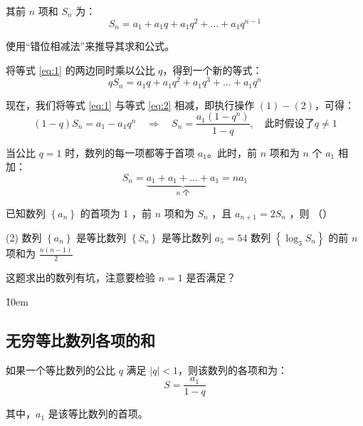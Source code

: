 \begin{theorem}
    其前 $n$ 项和 $S_n$ 为：
    \begin{equation}
        S_n = a_1 + a_1q + a_1q^2 + \dots + a_1q^{n-1} \label{eq:1}
    \end{equation}

    使用“错位相减法”来推导其求和公式。

    将等式 \eqref{eq:1} 的两边同时乘以公比 $q$，得到一个新的等式：
    \begin{equation}
        qS_n = a_1q + a_1q^2 + a_1q^3 + \dots + a_1q^n \label{eq:2}
    \end{equation}

    现在，我们将等式 \eqref{eq:1} 与等式 \eqref{eq:2} 相减，即执行操作 $(1) - (2)$，可得：
    $$ (1-q)S_n = a_1 - a_1q^n \quad \Rightarrow \quad S_n = \frac{a_1(1-q^n)}{1-q} , \quad \text{此时假设了} q \neq 1$$

    当公比 $q=1$ 时，数列的每一项都等于首项 $a_1$。此时，前 $n$ 项和为 $n$ 个 $a_1$ 相加：
    $$ S_n = \underbrace{a_1 + a_1 + \dots + a_1}_{n \text{ 个}} = na_1 $$
\end{theorem}

\begin{example}
    已知数列 $\left\{a_n\right\}$ 的首项为 1 ，前 $n$ 项和为 $S_n$ ，且 $a_{n+1}=2 S_n$ ，则 （\qquad）
    \begin{tasks}(2)
        \task 数列 $\left\{a_n\right\}$ 是等比数列
        \task $\left\{S_n\right\}$ 是等比数列
        \task $a_5=54$
        \task 数列 $\left\{\log _3 S_n\right\}$ 的前 $n$ 项和为 $\frac{n(n-1)}{2}$
    \end{tasks}
\end{example}

\begin{tips}
    这题求出的数列有坑，注意要检验 $n = 1$ 是否满足？
\end{tips}

\v{10em}

\subsection{无穷等比数列各项的和}

\begin{theorem}[无穷等比数列各项的和]
    如果一个等比数列的公比 $q$ 满足 $|q| < 1$，则该数列的各项和为：
    $$ S = \frac{a_1}{1-q} $$

    其中，$a_1$ 是该等比数列的首项。
\end{theorem}

